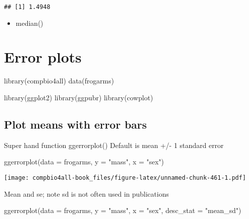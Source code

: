 \documentclass[
]{book}
\newenvironment{Shaded}{\begin{snugshade}}{\end{snugshade}}
\newcommand{\AttributeTok}[1]{\textcolor[rgb]{0.77,0.63,0.00}{#1}}
\newcommand{\FunctionTok}[1]{\textcolor[rgb]{0.00,0.00,0.00}{#1}}
\newcommand{\NormalTok}[1]{#1}
\newcommand{\StringTok}[1]{\textcolor[rgb]{0.31,0.60,0.02}{#1}}
\providecommand{\tightlist}{%
  \setlength{\itemsep}{0pt}\setlength{\parskip}{0pt}}
\begin{document}
\begin{verbatim}
## [1] 1.4948
\end{verbatim}

\begin{itemize}
\tightlist
\item
  median()
\end{itemize}

\hypertarget{error-plots}{%
\chapter{Error plots}\label{error-plots}}

\begin{Shaded}
\begin{Highlighting}[]
\FunctionTok{library}\NormalTok{(compbio4all)}
\FunctionTok{data}\NormalTok{(frogarms)}

\FunctionTok{library}\NormalTok{(ggplot2)}
\FunctionTok{library}\NormalTok{(ggpubr)}
\FunctionTok{library}\NormalTok{(cowplot)}
\end{Highlighting}
\end{Shaded}

\hypertarget{plot-means-with-error-bars}{%
\section{Plot means with error bars}\label{plot-means-with-error-bars}}

Super hand function ggerrorplot()
Default is mean +/- 1 standard error

\begin{Shaded}
\begin{Highlighting}[]
\FunctionTok{ggerrorplot}\NormalTok{(}\AttributeTok{data =}\NormalTok{ frogarms,}
          \AttributeTok{y =} \StringTok{"mass"}\NormalTok{,}
          \AttributeTok{x =} \StringTok{"sex"}\NormalTok{)}
\end{Highlighting}
\end{Shaded}

\texttt{[image: compbio4all-book\_files/figure-latex/unnamed-chunk-461-1.pdf]}

Mean and se; note sd is not often used in publications

\begin{Shaded}
\begin{Highlighting}[]
\FunctionTok{ggerrorplot}\NormalTok{(}\AttributeTok{data =}\NormalTok{ frogarms,}
          \AttributeTok{y =} \StringTok{"mass"}\NormalTok{,}
          \AttributeTok{x =} \StringTok{"sex"}\NormalTok{,}
          \AttributeTok{desc\_stat =} \StringTok{"mean\_sd"}\NormalTok{)}
\end{Highlighting}
\end{Shaded}
\end{document}
